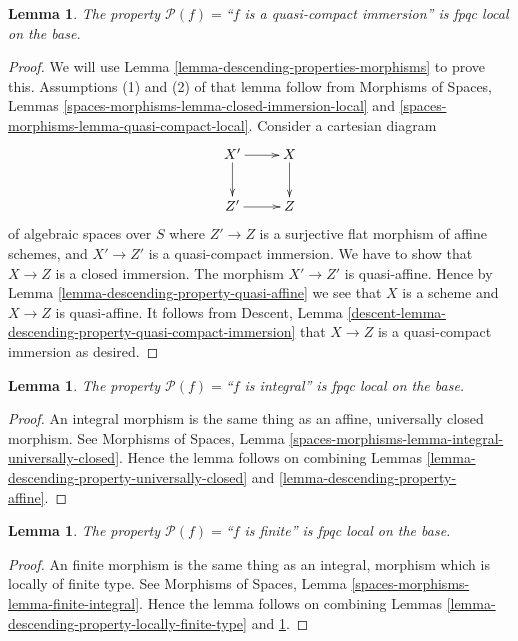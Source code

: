 \documentclass{stacks-project}
\theoremstyle{plain}
\newtheorem{lemma}[subsection]{Lemma}
\theoremstyle{definition}
\theoremstyle{remark}
\numberwithin{equation}{subsection}
\begin{document}
\begin{lemma}
\label{lemma-descending-property-quasi-compact-immersion}
The property $\mathcal{P}(f) =$``$f$ is a quasi-compact immersion''
is fpqc local on the base.
\end{lemma}

\begin{proof}
We will use
Lemma \ref{lemma-descending-properties-morphisms}
to prove this. Assumptions (1) and (2) of that lemma follow from
Morphisms of Spaces,
Lemmas \ref{spaces-morphisms-lemma-closed-immersion-local} and
\ref{spaces-morphisms-lemma-quasi-compact-local}.
Consider a cartesian diagram
$$
\xymatrix{
X' \ar[r] \ar[d] & X \ar[d] \\
Z' \ar[r] & Z
}
$$
of algebraic spaces over $S$
where $Z' \to Z$ is a surjective flat morphism of affine schemes,
and $X' \to Z'$ is a quasi-compact immersion. We have to show that $X \to Z$
is a closed immersion. The morphism $X' \to Z'$ is quasi-affine. Hence by
Lemma \ref{lemma-descending-property-quasi-affine}
we see that $X$ is a scheme and $X \to Z$ is quasi-affine.
It follows from
Descent, Lemma \ref{descent-lemma-descending-property-quasi-compact-immersion}
that $X \to Z$ is a quasi-compact immersion as desired.
\end{proof}

\begin{lemma}
\label{lemma-descending-property-integral}
The property $\mathcal{P}(f) =$``$f$ is integral''
is fpqc local on the base.
\end{lemma}

\begin{proof}
An integral morphism is the same thing as an affine,
universally closed morphism. See
Morphisms of Spaces,
Lemma \ref{spaces-morphisms-lemma-integral-universally-closed}.
Hence the lemma follows on combining
Lemmas \ref{lemma-descending-property-universally-closed}
and \ref{lemma-descending-property-affine}.
\end{proof}

\begin{lemma}
\label{lemma-descending-property-finite}
The property $\mathcal{P}(f) =$``$f$ is finite''
is fpqc local on the base.
\end{lemma}

\begin{proof}
An finite morphism is the same thing as an integral,
morphism which is locally of finite type. See
Morphisms of Spaces, Lemma \ref{spaces-morphisms-lemma-finite-integral}.
Hence the lemma follows on combining
Lemmas \ref{lemma-descending-property-locally-finite-type}
and \ref{lemma-descending-property-integral}.
\end{proof}
\end{document}
